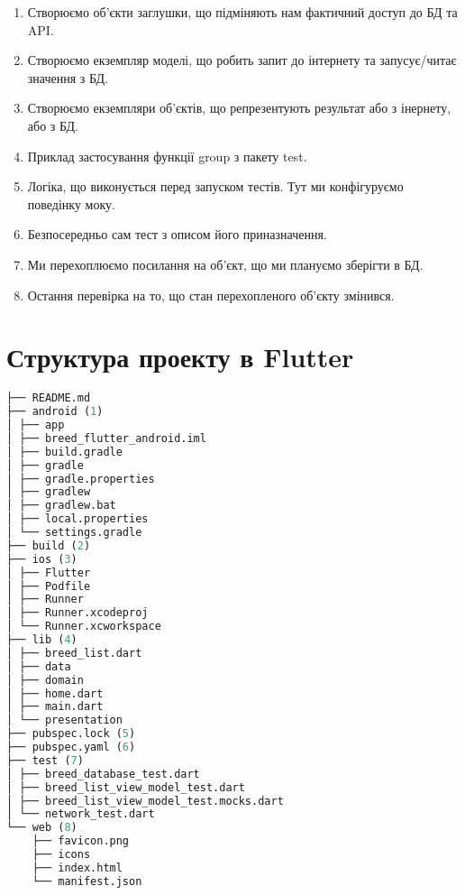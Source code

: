 \begin{enumerate}
    \item Створюємо об'єкти заглушки, що підміняють нам фактичний доступ до БД та API.
    \item Створюємо екземпляр моделі, що робить запит до інтернету та запусує/читає значення з БД.
    \item Створюємо екземпляри об'єктів, що репрезентують результат або з інернету, або з БД.
    \item Приклад застосування функції group з пакету test.
    \item Логіка, що виконується перед запуском тестів. Тут ми конфігуруємо поведінку моку.
    \item Безпосередньо сам тест з описом його приназначення.
    \item Ми перехоплюємо посилання на об'єкт, що ми плануємо зберігти в БД.
    \item Остання перевірка на то, що стан перехопленого об'єкту змінився.
\end{enumerate}

\section{Структура проекту в Flutter}
\label{section.3.7}

\begin{lstlisting}[style=light, language=Python,label={lst:flutter_project_layout},caption=Flutter Project Layout]
├── README.md
├── android (1)
│ ├── app
│ ├── breed_flutter_android.iml
│ ├── build.gradle
│ ├── gradle
│ ├── gradle.properties
│ ├── gradlew
│ ├── gradlew.bat
│ ├── local.properties
│ └── settings.gradle
├── build (2)
├── ios (3)
│ ├── Flutter
│ ├── Podfile
│ ├── Runner
│ ├── Runner.xcodeproj
│ └── Runner.xcworkspace
├── lib (4)
│ ├── breed_list.dart
│ ├── data
│ ├── domain
│ ├── home.dart
│ ├── main.dart
│ └── presentation
├── pubspec.lock (5)
├── pubspec.yaml (6)
├── test (7)
│ ├── breed_database_test.dart
│ ├── breed_list_view_model_test.dart
│ ├── breed_list_view_model_test.mocks.dart
│ └── network_test.dart
└── web (8)
    ├── favicon.png
    ├── icons
    ├── index.html
    └── manifest.json
\end{lstlisting}

